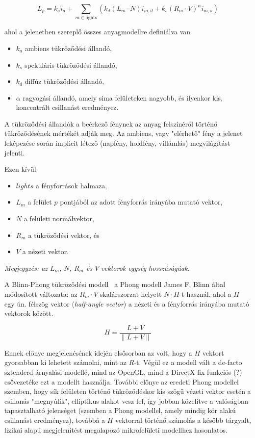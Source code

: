 \[
L_{p} = k_a i_a + \sum_{m \in \textrm{lights}} {\left( k_d (L_m \cdot N) i_{m,d} + k_s(R_m \cdot V)^\alpha i_{m,s} \right)}
\]

ahol a jelenetben szereplő összes anyagmodellre definiálva van

\begin{itemize}[noitemsep]
\item \(k_a\) ambiens tükröződési állandó,
\item \(k_s\) spekuláris tükröződési állandó,
\item \(k_d\) diffúz tükröződési állandó,
\item \(\alpha\) ragyogási állandó, amely sima felületeken nagyobb, és ilyenkor kis, koncentrált csillanást eredményez.
\end{itemize}

A tükröződési állandók a beérkező fénynek az anyag felszínéről történő tükröződésének mértékét adják meg. Az ambiens, vagy "elérhető" fény a jelenet leképezése során implicit létező (napfény, holdfény, villámlás) megvilágítást jelenti.

Ezen kívül

\begin{itemize}[noitemsep]
\item \(lights\) a fényforrások halmaza,
\item \(L_m\) a felület \(p\) pontjából az adott fényforrás irányába mutató vektor,
\item \(N\) a felületi normálvektor,
\item \(R_m\) a tükröződési vektor, és
\item \(V\) a nézeti vektor.
\end{itemize}

\textit{Megjegyzés: az \(L_m\), \(N\), \(R_m\) és \(V\) vektorok egység hosszúságúak.}

A Blinn-Phong tükröződési modell~\cite{blinn1977models} a Phong modell James F. Blinn által módosított változata: az \(R_m \cdot V\) skalárszorzat helyett \(N \cdot H\)-t használ, ahol a \(H\) egy ún. félszög vektor (\textit{half-angle vector}) a nézeti és a fényforrás irányába mutató vektorok között.

\[
H = \frac{ L + V }{ \| L + V \| }
\]

Ennek előnye megjelenésének idején elsősorban az volt, hogy a \(H\) vektort gyorsabban ki lehetett számolni, mint az \(R\)-t. Végül ez a modell vált a de-facto sztenderd árnyalási modellé, mind az OpenGL, mind a DirectX fix-funkciós (?) csővezetéke ezt a modellt használja. További előnye az eredeti Phong modellel szemben, hogy sík felületen történő tükröződéskor kis szögű vézeti vektor esetén a csillanás "megnyúlik", elliptikus alakot vesz fel, így jobban közelítve a valóságban tapasztalható jelenséget (szemben a Phong modellel, amely mindig kör alakú csillanást eredményez), továbbá a \(H\) vektorral történő számolás a később tárgyalt, fizikai alapú megjelenítést megalapozó mikrofelületi modellhez hasonlatos.

